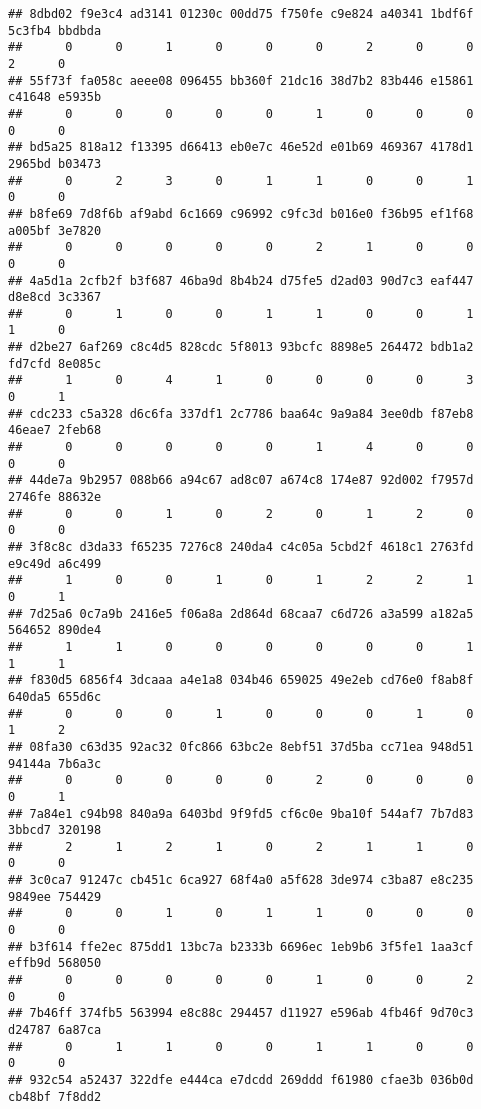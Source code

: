 \documentclass[
]{article}
\begin{document}
\begin{verbatim}
## 8dbd02 f9e3c4 ad3141 01230c 00dd75 f750fe c9e824 a40341 1bdf6f 5c3fb4 bbdbda 
##      0      0      1      0      0      0      2      0      0      2      0 
## 55f73f fa058c aeee08 096455 bb360f 21dc16 38d7b2 83b446 e15861 c41648 e5935b 
##      0      0      0      0      0      1      0      0      0      0      0 
## bd5a25 818a12 f13395 d66413 eb0e7c 46e52d e01b69 469367 4178d1 2965bd b03473 
##      0      2      3      0      1      1      0      0      1      0      0 
## b8fe69 7d8f6b af9abd 6c1669 c96992 c9fc3d b016e0 f36b95 ef1f68 a005bf 3e7820 
##      0      0      0      0      0      2      1      0      0      0      0 
## 4a5d1a 2cfb2f b3f687 46ba9d 8b4b24 d75fe5 d2ad03 90d7c3 eaf447 d8e8cd 3c3367 
##      0      1      0      0      1      1      0      0      1      1      0 
## d2be27 6af269 c8c4d5 828cdc 5f8013 93bcfc 8898e5 264472 bdb1a2 fd7cfd 8e085c 
##      1      0      4      1      0      0      0      0      3      0      1 
## cdc233 c5a328 d6c6fa 337df1 2c7786 baa64c 9a9a84 3ee0db f87eb8 46eae7 2feb68 
##      0      0      0      0      0      1      4      0      0      0      0 
## 44de7a 9b2957 088b66 a94c67 ad8c07 a674c8 174e87 92d002 f7957d 2746fe 88632e 
##      0      0      1      0      2      0      1      2      0      0      0 
## 3f8c8c d3da33 f65235 7276c8 240da4 c4c05a 5cbd2f 4618c1 2763fd e9c49d a6c499 
##      1      0      0      1      0      1      2      2      1      0      1 
## 7d25a6 0c7a9b 2416e5 f06a8a 2d864d 68caa7 c6d726 a3a599 a182a5 564652 890de4 
##      1      1      0      0      0      0      0      0      1      1      1 
## f830d5 6856f4 3dcaaa a4e1a8 034b46 659025 49e2eb cd76e0 f8ab8f 640da5 655d6c 
##      0      0      0      1      0      0      0      1      0      1      2 
## 08fa30 c63d35 92ac32 0fc866 63bc2e 8ebf51 37d5ba cc71ea 948d51 94144a 7b6a3c 
##      0      0      0      0      0      2      0      0      0      0      1 
## 7a84e1 c94b98 840a9a 6403bd 9f9fd5 cf6c0e 9ba10f 544af7 7b7d83 3bbcd7 320198 
##      2      1      2      1      0      2      1      1      0      0      0 
## 3c0ca7 91247c cb451c 6ca927 68f4a0 a5f628 3de974 c3ba87 e8c235 9849ee 754429 
##      0      0      1      0      1      1      0      0      0      0      0 
## b3f614 ffe2ec 875dd1 13bc7a b2333b 6696ec 1eb9b6 3f5fe1 1aa3cf effb9d 568050 
##      0      0      0      0      0      1      0      0      2      0      0 
## 7b46ff 374fb5 563994 e8c88c 294457 d11927 e596ab 4fb46f 9d70c3 d24787 6a87ca 
##      0      1      1      0      0      1      1      0      0      0      0 
## 932c54 a52437 322dfe e444ca e7dcdd 269ddd f61980 cfae3b 036b0d cb48bf 7f8dd2 

\end{verbatim}
\end{document}

